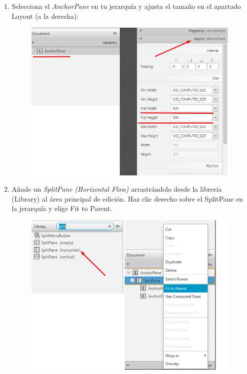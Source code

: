 \begin{enumerate}
	\item Selecciona el \textit{AnchorPane} en tu jerarquía y ajusta el tamaño en el apartado Layout (a la derecha):
	\begin{figure}[H]
		\includegraphics[width=11cm]{img/anchorPane}
	\end{figure}
	\item Añade un \textit{SplitPane (Horizontal Flow)} arrastrándolo desde la librería (Library) al área principal de edición. Haz clic derecho sobre el SplitPane en la jerarquía y elige Fit to Parent.
	\begin{figure}[H]
		\includegraphics[width=11cm]{img/splitPane}
	\end{figure}


\end{enumerate}
